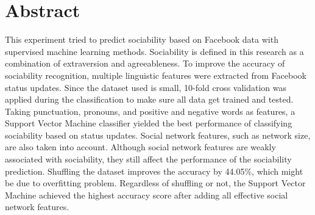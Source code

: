 \documentclass[
10pt, %
a4paper, %
oneside, %
headinclude,footinclude, %
] {book}%
\begin{document}

\chapter*{Abstract}

This experiment tried to predict sociability based on Facebook data with supervised machine learning methods. Sociability is defined in this research as a combination of extraversion and agreeableness. To improve the accuracy of sociability recognition, multiple linguistic features were extracted from Facebook status updates. Since the dataset used is small, 10-fold cross validation was applied during the classification to make sure all data get trained and tested. Taking punctuation, pronouns, and positive and negative words as features, a Support Vector Machine classifier yielded the best performance of classifying sociability based on status updates. Social network features, such as network size, are also taken into account. Although social network features are weakly associated with sociability, they still affect the performance of the sociability prediction. Shuffling the dataset improves the accuracy by 44.05\%, which might be due to overfitting problem. Regardless of shuffling or not, the Support Vector Machine achieved the highest accuracy score after adding all effective social network features.



\clearpage
\setcounter{tocdepth}{3} %
\tableofcontents %






\end{document}
